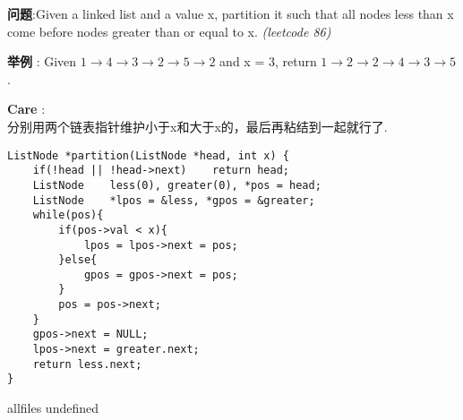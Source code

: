 \documentclass{article}
\begin{document}
\begin{CJK}{UTF8}{gbsn}     %

\else
    
\begin{description}
    \item{\textbf{问题}}:Given a linked list and a value x, partition it such that all nodes less than x come before nodes greater than or equal to x. \textit{(leetcode 86)}
    \item{\textbf{举例}} : Given $1\rightarrow4\rightarrow3\rightarrow2\rightarrow5\rightarrow2$ and x = 3, return $1\rightarrow2\rightarrow2\rightarrow4\rightarrow3\rightarrow5$.
    \item{\textbf{Care}} : 
    \\分别用两个链表指针维护小于x和大于x的，最后再粘结到一起就行了.
    \begin{lstlisting}
ListNode *partition(ListNode *head, int x) {
	if(!head || !head->next)	return head;
	ListNode	less(0), greater(0), *pos = head;
	ListNode	*lpos = &less, *gpos = &greater;
	while(pos){
		if(pos->val < x){
			lpos = lpos->next = pos;
		}else{
			gpos = gpos->next = pos;
		}
		pos = pos->next;
	}
	gpos->next = NULL;
	lpos->next = greater.next;
	return less.next;
}
    \end{lstlisting}
\end{description}

\fi

\ifx allfiles undefined
\end{CJK}
\end{document}
